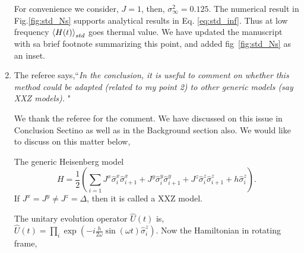 \documentclass[aps,prb,reprint,showpacs,floatfix,superscriptaddress, onecolumn, nofootinbib, 9pt]{revtex4-2}
\newcommand{\response}[1]{{\color{blue}#1}} %
\begin{document}
\begin{enumerate}
{			For convenience we consider, $J=1$, then, $\sigma_\infty^2 = 0.125$. The numerical result in Fig.\ref{fig:std_Ns} supports analytical results in Eq. \eqref{eq:std_inf}. Thus at low frequency $\expval{H(t)}_{std}$ goes thermal value. We have updated the manuscript with sa brief footnote summarizing this point, and added fig~\ref{fig:std_Ns} as an inset.
		}
		
		
		\vskip 2cm
		\item The referee says,``\textit{In the conclusion, it is useful to comment on whether this method could be adapted (related to my point 2) to other generic models (say
			XXZ models). }"\\
		
		\response{
		We thank the referee for the comment. We have discussed on this issue in Conclusion Sectino as well as in the Background section also.
		We would like to discuss on this matter below, 

		The generic Heisenberg model
			\begin{equation*}
				H = \frac12 \left( \sum_{i=1} J^x \hat{\sigma}^x_i \hat{\sigma}^x_{i+1} +J^y  \hat{\sigma}^y_i \hat{\sigma}^y_{i+1} + J^z  \hat{\sigma}^z_i \hat{\sigma}^z_{i+1} + h  \hat{\sigma}^z_i\right).
			\end{equation*}
			If $J^x= J^y \neq J^z=\Delta$, then it is called a XXZ model.
			
			The unitary evolution operator $\displaystyle \hat{U}(t)$ is, $\hat{U}(t)=\prod_{i} \exp \left(-i \frac{h}{2 \omega} \sin (\omega t) \hat{\sigma}_{i}^{z}\right)$. Now the Hamiltonian in rotating frame,
			
}
\end{enumerate}
\end{document}
